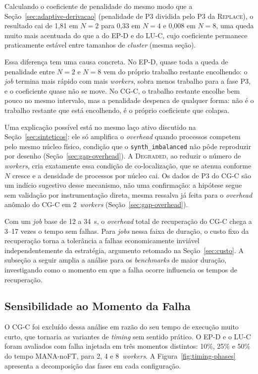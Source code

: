 Calculando o coeficiente de penalidade do mesmo modo que a
Seção~\ref{sec:adaptive-derivacao} (penalidade de P3 dividida pelo P3 da
\textsc{Replace}), o resultado cai de 1,81 em $N=2$ para 0,33 em $N=4$ e 0,008
em $N=8$, uma queda muito mais acentuada do que a do EP-D e do LU-C, cujo
coeficiente permanece praticamente estável entre tamanhos de \textit{cluster}
(mesma seção).

Essa diferença tem uma causa concreta. No EP-D, quase toda a queda de
penalidade entre $N=2$ e $N=8$ vem do próprio trabalho restante encolhendo: o
\textit{job} termina mais rápido com mais \textit{workers}, sobra menos
trabalho para a fase P3, e o coeficiente quase não se move. No CG-C, o
trabalho restante encolhe bem pouco no mesmo intervalo, mas a penalidade
despenca de qualquer forma: não é o trabalho restante que está encolhendo, é
o próprio coeficiente que colapsa.

Uma explicação possível está no mesmo laço ativo discutido na
Seção~\ref{sec:sinteticos}: ele só amplifica o \textit{overhead} quando
processos competem pelo mesmo núcleo físico, condição que o
\texttt{synth\_imbalanced} não pôde reproduzir por desenho
(Seção~\ref{sec:gap-overhead}). A \textsc{Degraded}, ao reduzir o número de
\textit{workers}, cria exatamente essa condição de co-localização, que se
atenua conforme $N$ cresce e a densidade de processos por núcleo cai. Os
dados de P3 do CG-C são um indício sugestivo desse mecanismo, não uma
confirmação: a hipótese segue sem validação por instrumentação direta, mesma
ressalva já feita para o \textit{overhead} anômalo do CG-C em 2~\textit{workers}
(Seção~\ref{sec:gap-overhead}).

Com um \textit{job} base de 12 a 34~s, o \textit{overhead} total de recuperação do
CG-C chega a 3--17 vezes o tempo sem falhas. Para \textit{jobs} nessa faixa de
duração, o custo fixo da recuperação torna a tolerância a falhas economicamente
inviável independentemente da estratégia, argumento retomado na Seção~\ref{sec:custo}.
A subseção a seguir amplia a análise para os \textit{benchmarks} de maior duração,
investigando como o momento em que a falha ocorre influencia os tempos de recuperação.

\subsection{Sensibilidade ao Momento da Falha}
\label{sec:timing-sensitivity}

O CG-C foi excluído dessa análise em razão do seu tempo de execução muito curto, que
tornaria as variantes de \textit{timing} sem sentido prático. O EP-D e o LU-C foram
avaliados com falha injetada em três momentos distintos: 10\%, 25\% e 50\% do tempo
MANA-noFT, para 2, 4 e 8~\textit{workers}.
A Figura~\ref{fig:timing-phases} apresenta a decomposição das fases em cada
configuração.

